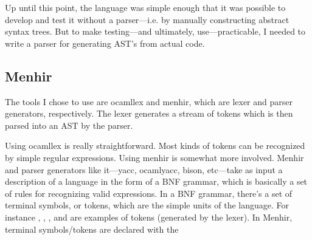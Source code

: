 \documentclass[pageno]{jpaper}
\begin{document}
{Up until this point, the language was simple enough that it was possible to develop and test it  without a parser---i.e. by manually constructing abstract syntax trees. But to make testing---and ultimately, use---practicable, I needed to write a parser for generating AST's from actual code.

\subsection{Menhir}

The tools I chose to use
are ocamllex and menhir, which are lexer and parser generators, respectively.
The lexer generates a stream of tokens which is then parsed into an AST by the parser.

Using ocamllex is really straightforward. Most kinds of tokens can be recognized by simple regular
expressions.
Using menhir is somewhat more involved. Menhir and parser generators like it---yacc, ocamlyacc, bison, etc---take as input a description of a language in the form of a BNF grammar, which is basically a set of rules
for recognizing valid expressions.  In a BNF grammar, there's a set of terminal symbols, or tokens, which are the simple units
of the language.  For instance \lsti{->}, , , and \lsti{+} are
examples of tokens (generated by the lexer). In Menhir, terminal symbols/tokens are declared with the \lsti{%

The nonterminal symbols are the complex expressions built up
out of tokens.  In this case, the primary nonterminal symbols are \lsti{exp} and \lsti{typ}, in
addition to a number of auxiliary nonterminals. Each nonterminal symbol has a set of alternative ways it can be matched. For instance, the \lsti{exp} nonterminal can be matched by something of the form
\lsti{<exp> + <exp>}, or by something of the form \lsti{\ <id> => <exp>}, and so forth. The alternatives are separated by vertical bars. Thus, the syntax and semantics of BNF grammars are very much like
the syntax and semantics of algebraic datatypes.

Note also that, since we don't just want to \textit{recognize} a language---we also want to generate
an abstract syntax tree---we can put an OCaml expression in braces to the right of each alternative.

Given the analogy between grammars and datatypes, one might (and I did) naively write a grammar for the simply
typed lambda calculus as follows:

}}
\end{document}
